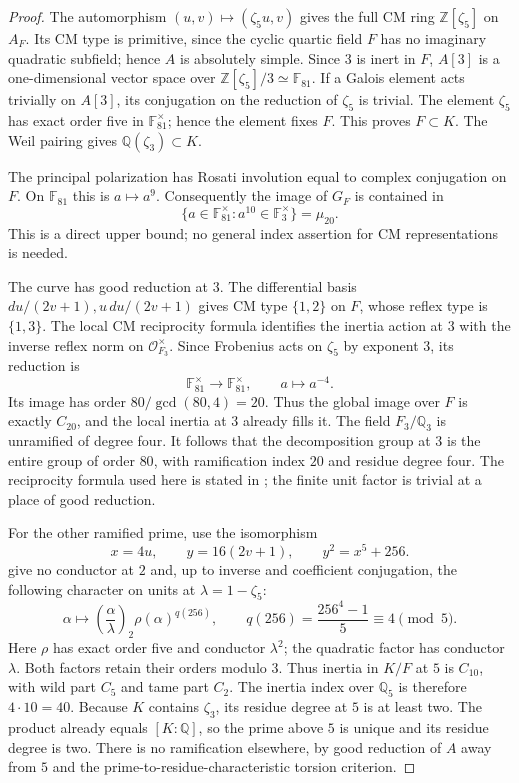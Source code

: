 \begin{proof}
The automorphism $(u,v)\mapsto(\zeta_5u,v)$ gives the full CM ring
$\mathbb Z[\zeta_5]$ on $A_F$. Its CM type is primitive, since the
cyclic quartic field $F$ has no imaginary quadratic subfield; hence
$A$ is absolutely simple.  Since $3$ is inert in $F$,
$A[3]$ is a one-dimensional vector space over
$\mathbb Z[\zeta_5]/3\simeq\mathbb F_{81}$.
If a Galois element acts trivially on $A[3]$, its conjugation on
the reduction of $\zeta_5$ is trivial.  The element $\zeta_5$
has exact order five in $\mathbb F_{81}^{\times}$; hence the
element fixes $F$.  This proves $F\subset K$.
The Weil pairing gives $\mathbb Q(\zeta_3)\subset K$.

The principal polarization has Rosati involution equal to
complex conjugation on $F$.  On $\mathbb F_{81}$ this is
$a\mapsto a^9$.  Consequently the image of $G_F$ is contained in
\[
 \{a\in\mathbb F_{81}^{\times}:a^{10}\in\mathbb F_3^{\times}\}
 =\mu_{20}.
\]
This is a direct upper bound; no general index assertion for CM
representations is needed.

The curve has good reduction at $3$.  The differential basis
$du/(2v+1),u\,du/(2v+1)$ gives CM type $\{1,2\}$ on $F$,
whose reflex type is $\{1,3\}$.  The local CM reciprocity
formula identifies the inertia action at $3$ with the inverse
reflex norm on $\mathcal O_{F_3}^{\times}$.
Since Frobenius acts on $\zeta_5$ by exponent $3$, its reduction is
\[
 \mathbb F_{81}^{\times}\longrightarrow\mathbb F_{81}^{\times},
 \qquad a\longmapsto a^{-4}.
\]
Its image has order $80/\gcd(80,4)=20$.  Thus the global
image over $F$ is exactly $C_{20}$, and the local inertia at
$3$ already fills it.  The field $F_3/\mathbb Q_3$ is
unramified of degree four.  It follows that the decomposition
group at $3$ is the entire group of order $80$, with
ramification index $20$ and residue degree four.
The reciprocity formula used here is stated in
\citet[Theorem~5.1, pp.~483--484]{Lombardo2017}; the
finite unit factor is trivial at a place of good reduction.

For the other ramified prime, use the isomorphism
\[
 x=4u,\qquad y=16(2v+1),\qquad y^2=x^5+256.
\]
\citet[Proposition~2.2(4)--(5), author p.~4]{StollYang2003}
give no conductor at $2$ and, up to inverse and coefficient
conjugation, the following character on
units at $\lambda=1-\zeta_5$:
\[
 \alpha\longmapsto
 \left(\frac{\alpha}{\lambda}\right)_2
 \rho(\alpha)^{q(256)},\qquad
 q(256)=\frac{256^4-1}{5}\equiv4\pmod5.
\]
Here $\rho$ has exact order five and conductor $\lambda^2$;
the quadratic factor has conductor $\lambda$.
Both factors retain their orders modulo $3$.
Thus inertia in $K/F$ at $5$ is $C_{10}$, with wild part
$C_5$ and tame part $C_2$.  The inertia index over
$\mathbb Q_5$ is therefore $4\cdot10=40$.
Because $K$ contains $\zeta_3$, its residue degree at $5$
is at least two.  The product already equals $[K:\mathbb Q]$,
so the prime above $5$ is unique and its residue degree is two.
There is no ramification elsewhere, by good reduction of
$A$ away from $5$ and the prime-to-residue-characteristic
torsion criterion.


\end{proof}
